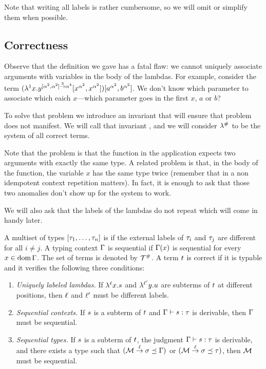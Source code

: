 Note that writing all labels is rather cumbersome, so we will omit or simplify them when possible.

\subsection{Correctness}
Observe that the definition we gave has a fatal flaw:
we cannot uniquely associate arguments with variables in the body of the lambdas.
For example, consider the term
$(\lambda^{1} x. y^{[\alpha^2, \alpha^2] \overset{3}{\to} \alpha^4} [x^{\alpha^2}, x^{\alpha^2}])
[a^{\alpha^2}, b^{\alpha^2}]$.
We don't know which parameter to associate which eaich $x$---which parameter goes in the first $x$, $a$ or $b$?

To solve that problem we introduce an invariant that will ensure
that problem does not manifest.
We will call that invariant ,
and we will consider $\lambda^{\mathtt{\#}}$ to be the system of all correct terms.

Note that the problem is that the function in the application expects two arguments
with exactly the same type. A related problem is that, in the body of the function,
the variable $x$ has the same type twice (remember that in a non idempotent context repetition matters).
In fact, it is enough to ask that those two anomalies don't show up for the system to work.

We will also ask that the labels of the lambdas do not repeat which
will come in handy later.

\begin{definition}
A multiset of types $[\tau_1,\hdots,\tau_n]$ is 
if the external labels of $\tau_i$ and $\tau_j$ are different for all $i \neq j$.
A typing context $\Gamma$ is sequential if $\Gamma(x)$ is sequential for every $x \in \operatorname{dom}\Gamma$.
The set of  terms is denoted by $\mathcal{T}^{\mathtt{\#}}$.
A term $t$ is correct if it is typable and it verifies the following three conditions:
\begin{enumerate}
\item {\em Uniquely labeled lambdas.}
  If $\lambda^{\ell} x. s$ and $\lambda^{\ell'} y. u$ 
  are subterms of $t$ at different positions, then $\ell$ and $\ell'$
  must be different labels.
\item {\em Sequential contexts.}
  If $s$ is a subterm of $t$ and $\Gamma \vdash s : \tau$
  is derivable, then $\Gamma$ must be sequential.
\item {\em Sequential types.}
  If $s$ is a subterm of $t$,
  the judgment $\Gamma \vdash s : \tau$ is derivable,
  and there exists a type such that
  $(\mathcal{M} \overset{\ell}{\to} \sigma \preceq \Gamma)$ or $(\mathcal{M} \overset{\ell}{\to} \sigma \preceq \tau)$,
  then $\mathcal{M}$ must be sequential.
\end{enumerate}
\end{definition}

